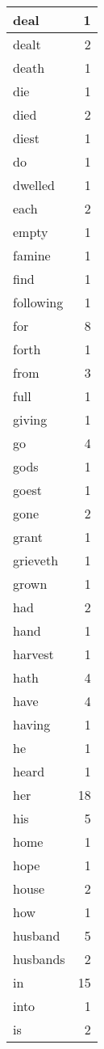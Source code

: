 \begin{center}
\begin{longtable}{l|r}
deal & 1 \\ \hline
dealt & 2 \\ \hline
death & 1 \\ \hline
die & 1 \\ \hline
died & 2 \\ \hline
diest & 1 \\ \hline
do & 1 \\ \hline
dwelled & 1 \\ \hline
each & 2 \\ \hline
empty & 1 \\ \hline
famine & 1 \\ \hline
find & 1 \\ \hline
following & 1 \\ \hline
for & 8 \\ \hline
forth & 1 \\ \hline
from & 3 \\ \hline
full & 1 \\ \hline
giving & 1 \\ \hline
go & 4 \\ \hline
gods & 1 \\ \hline
goest & 1 \\ \hline
gone & 2 \\ \hline
grant & 1 \\ \hline
grieveth & 1 \\ \hline
grown & 1 \\ \hline
had & 2 \\ \hline
hand & 1 \\ \hline
harvest & 1 \\ \hline
hath & 4 \\ \hline
have & 4 \\ \hline
having & 1 \\ \hline
he & 1 \\ \hline
heard & 1 \\ \hline
her & 18 \\ \hline
his & 5 \\ \hline
home & 1 \\ \hline
hope & 1 \\ \hline
house & 2 \\ \hline
how & 1 \\ \hline
husband & 5 \\ \hline
husbands & 2 \\ \hline
in & 15 \\ \hline
into & 1 \\ \hline
is & 2 \\ \hline

\end{longtable}
\end{center}
